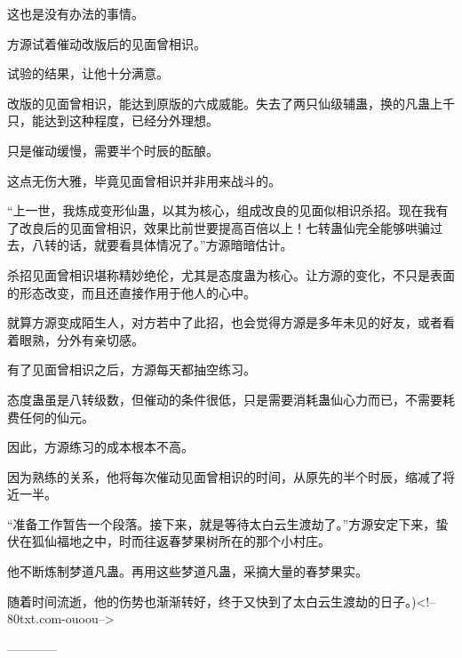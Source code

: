 \begin{this_body}
这也是没有办法的事情。

方源试着催动改版后的见面曾相识。

试验的结果，让他十分满意。

改版的见面曾相识，能达到原版的六成威能。失去了两只仙级辅蛊，换的凡蛊上千只，能达到这种程度，已经分外理想。

只是催动缓慢，需要半个时辰的酝酿。

这点无伤大雅，毕竟见面曾相识并非用来战斗的。

“上一世，我炼成变形仙蛊，以其为核心，组成改良的见面似相识杀招。现在我有了改良后的见面曾相识，效果比前世要提高百倍以上！七转蛊仙完全能够哄骗过去，八转的话，就要看具体情况了。”方源暗暗估计。

杀招见面曾相识堪称精妙绝伦，尤其是态度蛊为核心。让方源的变化，不只是表面的形态改变，而且还直接作用于他人的心中。

就算方源变成陌生人，对方若中了此招，也会觉得方源是多年未见的好友，或者看着眼熟，分外有亲切感。

有了见面曾相识之后，方源每天都抽空练习。

态度蛊虽是八转级数，但催动的条件很低，只是需要消耗蛊仙心力而已，不需要耗费任何的仙元。

因此，方源练习的成本根本不高。

因为熟练的关系，他将每次催动见面曾相识的时间，从原先的半个时辰，缩减了将近一半。

“准备工作暂告一个段落。接下来，就是等待太白云生渡劫了。”方源安定下来，蛰伏在狐仙福地之中，时而往返春梦果树所在的那个小村庄。

他不断炼制梦道凡蛊。再用这些梦道凡蛊，采摘大量的春梦果实。

随着时间流逝，他的伤势也渐渐转好，终于又快到了太白云生渡劫的日子。)<!--80txt.com-ouoou-->

------------

\end{this_body}

